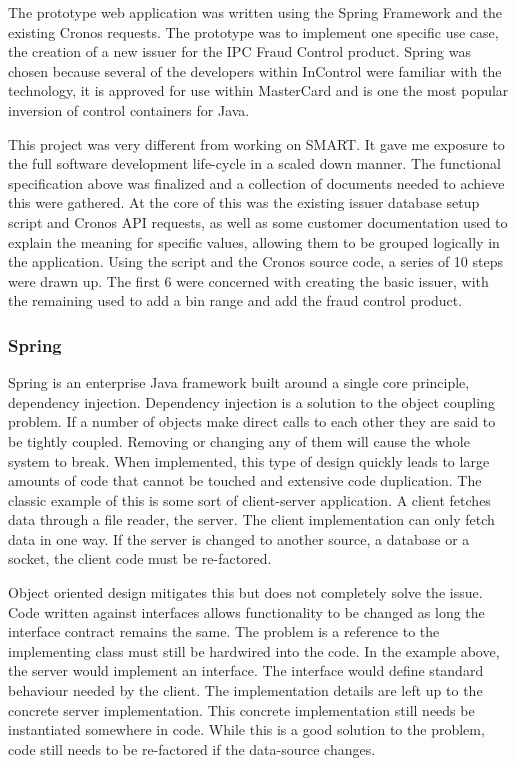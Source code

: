 \documentclass[a4paper, 11pt, titlepage]{article}
\begin{document}
The prototype web application was written using the Spring Framework \cite{Spring} and the existing Cronos requests. The prototype was to implement one specific use case, the creation of a new issuer for the IPC Fraud Control product. \pageref{fraud_control}
Spring was chosen because several of the developers within InControl were familiar with the technology, it is approved for use within MasterCard and is one the most popular inversion of control containers for Java. 

This project was very different from working on SMART. It gave me exposure to the full software development life-cycle in a scaled down manner. The functional specification above was finalized and a collection of documents needed to achieve this were gathered. At the core of this was the existing issuer database setup script and Cronos API requests, as well as some customer documentation used to explain the meaning for specific values, allowing them to be grouped logically in the application. 
Using the script and the Cronos source code, a series of 10 steps were drawn up. The first 6 were concerned with creating the basic issuer, with the remaining used to add a bin range and add the fraud control product. 
 
\subsubsection{Spring} 
 
Spring is an enterprise Java framework built around a single core principle, dependency injection. Dependency injection is a solution to the object coupling problem. If a number of objects make direct calls to each other they are said to be tightly coupled. Removing or changing any of them will cause the whole system to break. When implemented, this type of design quickly leads to large amounts of code that cannot be touched and extensive code duplication. The classic example of this is some sort of client-server application. A client fetches data through a file reader, the server. The client implementation can only fetch data in one way. If the server is changed to another source, a database or a socket, the client code must be re-factored.  
 
Object oriented design mitigates this but does not completely solve the issue. Code written against interfaces allows functionality to be changed as long the interface contract remains the same. The problem is a reference to the implementing class must still be hardwired into the code. In the example above, the server would implement an interface. The interface would define standard behaviour needed by the client. The implementation details are left up to the concrete server implementation. This concrete implementation still needs be instantiated somewhere in code. While this is a good solution to the problem, code still needs to be re-factored if the data-source changes. 
 
\end{document}
